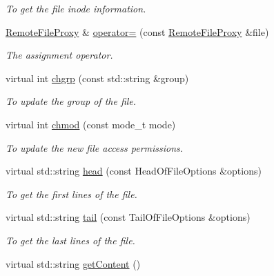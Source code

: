 \begin{DoxyCompactItemize}
\begin{DoxyCompactList}\small\item\em To get the file inode information. \item\end{DoxyCompactList}\item 
\hyperlink{classRemoteFileProxy}{RemoteFileProxy} \& \hyperlink{classRemoteFileProxy_a8f9c34f0bbf8951c33d4037096df7a54}{operator=} (const \hyperlink{classRemoteFileProxy}{RemoteFileProxy} \&file)
\begin{DoxyCompactList}\small\item\em The assignment operator. \item\end{DoxyCompactList}\item 
virtual int \hyperlink{classRemoteFileProxy_aa531dc112c82a1a60e09006a940638f1}{chgrp} (const std::string \&group)
\begin{DoxyCompactList}\small\item\em To update the group of the file. \item\end{DoxyCompactList}\item 
virtual int \hyperlink{classRemoteFileProxy_aab9b3e742ebbc607be68ed01f9bc8b3b}{chmod} (const mode\_\-t mode)
\begin{DoxyCompactList}\small\item\em To update the new file access permissions. \item\end{DoxyCompactList}\item 
virtual std::string \hyperlink{classRemoteFileProxy_af0b29be33b052dfa085bdbd3636ee0c5}{head} (const HeadOfFileOptions \&options)
\begin{DoxyCompactList}\small\item\em To get the first lines of the file. \item\end{DoxyCompactList}\item 
virtual std::string \hyperlink{classRemoteFileProxy_a45f18885dee050419b72e36283031bdb}{tail} (const TailOfFileOptions \&options)
\begin{DoxyCompactList}\small\item\em To get the last lines of the file. \item\end{DoxyCompactList}\item 
virtual std::string \hyperlink{classRemoteFileProxy_a45994a64cf7d8f649707087eedb3466e}{getContent} ()

\end{DoxyCompactItemize}
